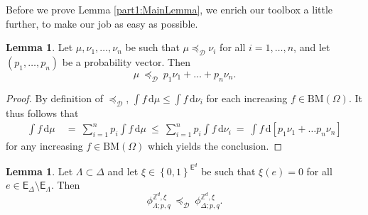 \documentclass[12pt]{article}
\newcommand{\D}{\mathcal{D}}
\renewcommand{\d}{\mathrm{d}}
\newcommand{\E}{\mathsf{E}}
\newcommand{\Z}{\mathbb{Z}}
\newcommand{\BM}{\mathrm{BM}}
\newcommand{\set}[1]{\left\{#1\right\}}
\newcommand{\1}{\mathbbm{1}}
\newcommand{\5}{\vspace{0.5cm}}
\theoremstyle{definition}
\newtheorem{lem}[thm]{Lemma}
\begin{document}
Before we prove Lemma \ref{part1:MainLemma}, we enrich our toolbox a little further, to make our job as easy as possible.

\begin{lem}\label{Part1:Lemma1}
Let $\mu,\nu_1,\ldots,\nu_n$ be such that $\mu\preceq_\D\nu_i$ for all $i=1,\ldots,n$, and let $(p_1,\ldots,p_n)$ be a probability vector. Then
$$\mu ~\preceq_\D~ p_1\nu_1+\ldots+p_n\nu_n.$$
\end{lem}
\begin{proof}
By definition of $\preceq_\D$, $\int f\,\d\mu\leq\int f\,\d\nu_i$ for each increasing $f\in\BM(\Omega)$. It thus follows that
\begin{align*}
\int f\,\d\mu ~&=~ \sum_{i=1}^n p_i\int f\,\d\mu ~\leq~ \sum_{i=1}^n p_i\int f\,\d\nu_i ~=~ \int f\,\d[p_1\nu_1+\ldots p_n\nu_n]
\end{align*}
for any increasing $f\in\BM(\Omega)$ which yields the conclusion.
\end{proof}

\begin{lem}\label{Part1:Lemma2}
Let $\Lambda\subset\Delta$ and let $\xi\in\set{0,1}^{\E^d}$ be such that $\xi(e)=0$ for all $e\in\E_\Delta\setminus\E_\Lambda$. Then
$$\phi_{\Lambda;p,q}^{\Z^d,\xi} ~\preceq_\D~ \phi_{\Delta;p,q}^{\Z^d,\xi}.$$
\end{lem}
\end{document}
